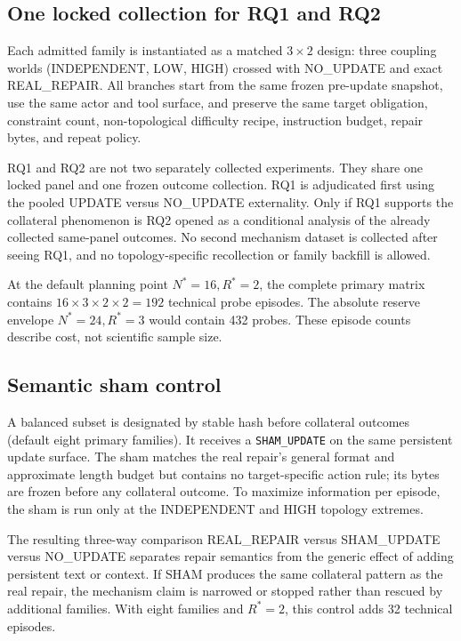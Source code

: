 \documentclass{article}
\begin{document}
\subsection{One locked collection for RQ1 and RQ2}
Each admitted family is instantiated as a matched $3\times2$ design: three coupling worlds (INDEPENDENT, LOW, HIGH) crossed with NO\_UPDATE and exact REAL\_REPAIR. All branches start from the same frozen pre-update snapshot, use the same actor and tool surface, and preserve the same target obligation, constraint count, non-topological difficulty recipe, instruction budget, repair bytes, and repeat policy.

RQ1 and RQ2 are not two separately collected experiments. They share one locked panel and one frozen outcome collection. RQ1 is adjudicated first using the pooled UPDATE versus NO\_UPDATE externality. Only if RQ1 supports the collateral phenomenon is RQ2 opened as a conditional analysis of the already collected same-panel outcomes. No second mechanism dataset is collected after seeing RQ1, and no topology-specific recollection or family backfill is allowed.

At the default planning point $N^*=16,R^*=2$, the complete primary matrix contains $16\times3\times2\times2=192$ technical probe episodes. The absolute reserve envelope $N^*=24,R^*=3$ would contain 432 probes. These episode counts describe cost, not scientific sample size.

\subsection{Semantic sham control}
A balanced subset is designated by stable hash before collateral outcomes (default eight primary families). It receives a \texttt{SHAM\_UPDATE} on the same persistent update surface. The sham matches the real repair's general format and approximate length budget but contains no target-specific action rule; its bytes are frozen before any collateral outcome. To maximize information per episode, the sham is run only at the INDEPENDENT and HIGH topology extremes.

The resulting three-way comparison REAL\_REPAIR versus SHAM\_UPDATE versus NO\_UPDATE separates repair semantics from the generic effect of adding persistent text or context. If SHAM produces the same collateral pattern as the real repair, the mechanism claim is narrowed or stopped rather than rescued by additional families. With eight families and $R^*=2$, this control adds 32 technical episodes.
\end{document}
